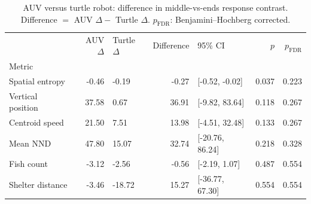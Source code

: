 \begin{table}
\caption{AUV versus turtle robot: difference in middle-vs-ends response contrast. Difference $=$ AUV $\Delta -$ Turtle $\Delta$. $p_{\text{FDR}}$: Benjamini--Hochberg corrected.}
\label{tab:auv_vs_turtle}
\begin{tabular}{lrlrlrr}
\toprule
 & AUV $\Delta$ & Turtle $\Delta$ & Difference & 95\% CI & $p$ & $p_{\text{FDR}}$ \\
Metric &  &  &  &  &  &  \\
\midrule
Spatial entropy & -0.46 & -0.19 & -0.27 & [-0.52, -0.02] & 0.037 & 0.223 \\
Vertical position & 37.58 & 0.67 & 36.91 & [-9.82, 83.64] & 0.118 & 0.267 \\
Centroid speed & 21.50 & 7.51 & 13.98 & [-4.51, 32.48] & 0.133 & 0.267 \\
Mean NND & 47.80 & 15.07 & 32.74 & [-20.76, 86.24] & 0.218 & 0.328 \\
Fish count & -3.12 & -2.56 & -0.56 & [-2.19, 1.07] & 0.487 & 0.554 \\
Shelter distance & -3.46 & -18.72 & 15.27 & [-36.77, 67.30] & 0.554 & 0.554 \\
\bottomrule
\end{tabular}
\end{table}

